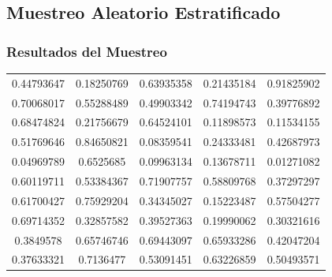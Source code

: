 \documentclass[12pt,a4paper]{article}
\begin{document}
    \subsection{Muestreo Aleatorio Estratificado}

    \subsubsection{Resultados del Muestreo}
        \begin{center}
            \begin{tabular}{ccccc}
                0.44793647 & 0.18250769 & 0.63935358 & 0.21435184 & 0.91825902 \\
                0.70068017 & 0.55288489 & 0.49903342 & 0.74194743 & 0.39776892 \\
                0.68474824 & 0.21756679 & 0.64524101 & 0.11898573 & 0.11534155 \\
                0.51769646 & 0.84650821 & 0.08359541 & 0.24333481 & 0.42687973 \\
                0.04969789 & 0.6525685  & 0.09963134 & 0.13678711 & 0.01271082 \\
                0.60119711 & 0.53384367 & 0.71907757 & 0.58809768 & 0.37297297 \\
                0.61700427 & 0.75929204 & 0.34345027 & 0.15223487 & 0.57504277 \\
                0.69714352 & 0.32857582 & 0.39527363 & 0.19990062 & 0.30321616 \\
                0.3849578  & 0.65746746 & 0.69443097 & 0.65933286 & 0.42047204 \\
                0.37633321 & 0.7136477  & 0.53091451 & 0.63226859 & 0.50493571 
            \end{tabular}
        \end{center}
\end{document}
